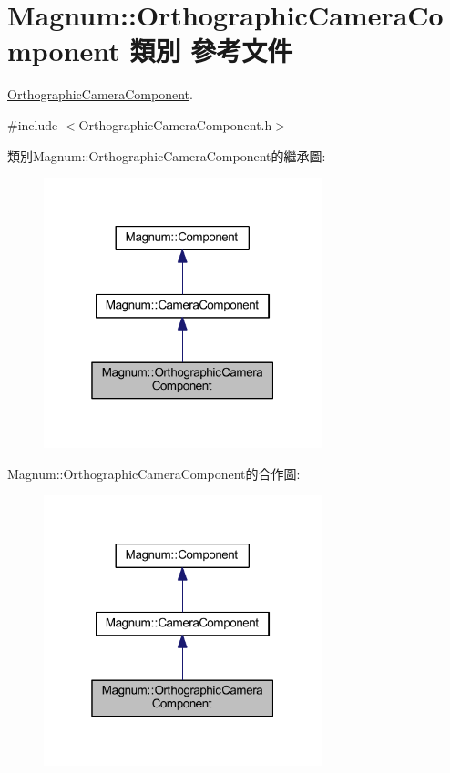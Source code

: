 \hypertarget{class_magnum_1_1_orthographic_camera_component}{}\section{Magnum\+:\+:Orthographic\+Camera\+Component 類別 參考文件}
\label{class_magnum_1_1_orthographic_camera_component}


\hyperlink{class_magnum_1_1_orthographic_camera_component}{Orthographic\+Camera\+Component}.  




{\ttfamily \#include $<$Orthographic\+Camera\+Component.\+h$>$}



類別\+Magnum\+:\+:Orthographic\+Camera\+Component的繼承圖\+:\nopagebreak
\begin{figure}[H]
\begin{center}
\leavevmode
\includegraphics[width=229pt]{class_magnum_1_1_orthographic_camera_component__inherit__graph}
\end{center}
\end{figure}


Magnum\+:\+:Orthographic\+Camera\+Component的合作圖\+:\nopagebreak
\begin{figure}[H]
\begin{center}
\leavevmode
\includegraphics[width=229pt]{class_magnum_1_1_orthographic_camera_component__coll__graph}
\end{center}
\end{figure}
